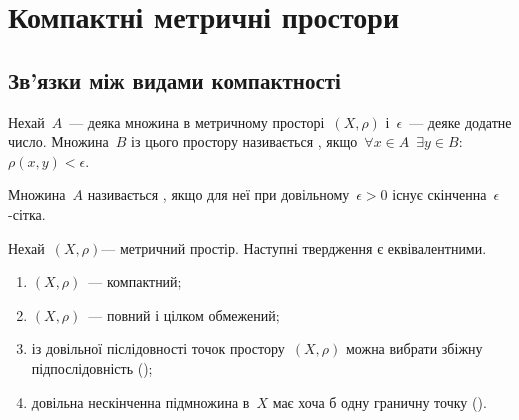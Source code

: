 \chapter{Компактні метричні простори}

\section{Зв'язки між видами компактності}

\begin{definition}
Нехай~$A$~--- деяка множина в метричному
просторі~$(X, \rho)$ і~$\epsilon$~--- деяке додатне число. Множина~$B$
із цього простору називається ,
якщо~$\forall x \in A$~$\exists y \in B$: $\rho(x, y) < \epsilon$.
\end{definition}

\begin{definition}
Множина~$A$ називається ,
якщо для неї при довільному~$\epsilon > 0$ існує скінченна~$\epsilon$-сітка.
\end{definition}

\begin{theorem}
[Хаусдорф] Нехай~$(X, \rho)$--- метричний
простір. Наступні твердження є еквівалентними.
\begin{enumerate}
\item $(X, \rho)$~--- компактний;
\item $(X, \rho)$~--- повний і цілком обмежений;
\item із довільної післідовності точок простору~$(X, \rho)$
можна вибрати збіжну підпослідовність
();
\item довільна нескінченна підмножина в~$X$ має хоча б одну
граничну точку ().
\end{enumerate}
\end{theorem}

